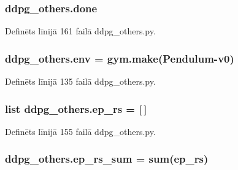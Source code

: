 \subsubsection[{\texorpdfstring{done}{done}}]{\setlength{\rightskip}{0pt plus 5cm}ddpg\+\_\+others.\+done}\hypertarget{namespaceddpg__others_ae2aa87b119af7536ff9c20bd0bcba552}{}\label{namespaceddpg__others_ae2aa87b119af7536ff9c20bd0bcba552}


Definēts līnijā 161 failā ddpg\+\_\+others.\+py.

\subsubsection[{\texorpdfstring{env}{env}}]{\setlength{\rightskip}{0pt plus 5cm}ddpg\+\_\+others.\+env = gym.\+make(\textquotesingle{}Pendulum-\/v0\textquotesingle{})}\hypertarget{namespaceddpg__others_afd02a34b64d07267055995ecab1de1d6}{}\label{namespaceddpg__others_afd02a34b64d07267055995ecab1de1d6}


Definēts līnijā 135 failā ddpg\+\_\+others.\+py.

\subsubsection[{\texorpdfstring{ep\+\_\+rs}{ep_rs}}]{\setlength{\rightskip}{0pt plus 5cm}list ddpg\+\_\+others.\+ep\+\_\+rs = \mbox{[}$\,$\mbox{]}}\hypertarget{namespaceddpg__others_a8b02d06c3efd8c65bd22c59b0be4046a}{}\label{namespaceddpg__others_a8b02d06c3efd8c65bd22c59b0be4046a}


Definēts līnijā 155 failā ddpg\+\_\+others.\+py.

\subsubsection[{\texorpdfstring{ep\+\_\+rs\+\_\+sum}{ep_rs_sum}}]{\setlength{\rightskip}{0pt plus 5cm}ddpg\+\_\+others.\+ep\+\_\+rs\+\_\+sum = sum({\bf ep\+\_\+rs})}\hypertarget{namespaceddpg__others_ae0eea715ecb8dfc45dfea85e23ff27ad}{}\label{namespaceddpg__others_ae0eea715ecb8dfc45dfea85e23ff27ad}


